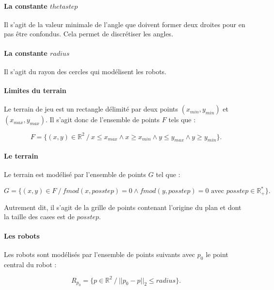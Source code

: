 \documentclass{article}
\begin{document}
\paragraph{La constante $thetastep$} Il s'agit de la valeur minimale de l'angle que doivent former deux droites pour en pas être confondus. Cela permet de discrétiser les angles.

\paragraph{La constante $radius$} Il s'agit du rayon des cercles qui modélisent les robots.

\paragraph{Limites du terrain} Le terrain de jeu est un rectangle délimité par deux points $(x_{min}, y_{min})$ et $(x_{max}, y_{max})$. Il s'agit donc de l'ensemble de points $F$ tels que :

\begin{equation*}
F = \{ (x, y) \in \mathbb{R}^2 \ /\  x \leqslant x_{max} \wedge x \geqslant x_{min} \wedge y \leqslant y_{max} \wedge y \geqslant y_{min} \}.
\end{equation*}

\paragraph{Le terrain} Le terrain est modélisé par l'ensemble de points $G$ tel que :

\begin{equation*}
G = \{ (x, y) \in F \ /\  fmod(x, posstep) = 0 \wedge fmod(y, posstep) = 0 \text{ avec } posstep \in \mathbb{R}^*_+ \}.
\end{equation*}

Autrement dit, il s'agit de la grille de points contenant l'origine du plan et dont la taille des cases est de $posstep$.

\paragraph{Les robots} Les robots sont modélisés par l'ensemble de points suivants avec $p_0$ le point central du robot :

\begin{equation*}
    R_{p_0} = \{ p \in \mathbb{R}^2 \ /\  ||p_0 - p||_2 \leqslant radius \}.
\end{equation*}
\end{document}
